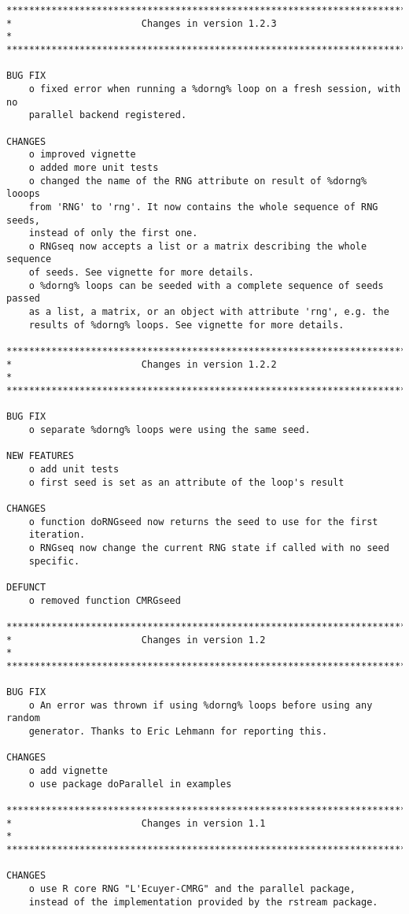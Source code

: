 \documentclass[a4paper,12pt]{article}\usepackage[]{graphicx}\usepackage[]{color}
\begin{document}
{\begin{verbatim}
*************************************************************************
*                       Changes in version 1.2.3                        *
*************************************************************************

BUG FIX
    o fixed error when running a %dorng% loop on a fresh session, with no  
    parallel backend registered.  

CHANGES
    o improved vignette
    o added more unit tests
    o changed the name of the RNG attribute on result of %dorng% looops 
    from 'RNG' to 'rng'. It now contains the whole sequence of RNG seeds, 
    instead of only the first one.
    o RNGseq now accepts a list or a matrix describing the whole sequence 
    of seeds. See vignette for more details.
    o %dorng% loops can be seeded with a complete sequence of seeds passed 
    as a list, a matrix, or an object with attribute 'rng', e.g. the 
    results of %dorng% loops. See vignette for more details.
    
*************************************************************************
*                       Changes in version 1.2.2                        *
*************************************************************************

BUG FIX
    o separate %dorng% loops were using the same seed.

NEW FEATURES
    o add unit tests
    o first seed is set as an attribute of the loop's result

CHANGES
    o function doRNGseed now returns the seed to use for the first 
    iteration.
    o RNGseq now change the current RNG state if called with no seed 
    specific.  
    
DEFUNCT
    o removed function CMRGseed

*************************************************************************
*                       Changes in version 1.2                          *
*************************************************************************

BUG FIX
    o An error was thrown if using %dorng% loops before using any random
    generator. Thanks to Eric Lehmann for reporting this.

CHANGES
    o add vignette
    o use package doParallel in examples

*************************************************************************
*                       Changes in version 1.1                          *
*************************************************************************

CHANGES
    o use R core RNG "L'Ecuyer-CMRG" and the parallel package, 
    instead of the implementation provided by the rstream package.

\end{verbatim}
}
\end{document}
